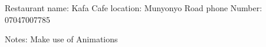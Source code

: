Restaurant name: Kafa Cafe
location: Munyonyo Road
phone Number: 07047007785

Notes:
Make use of Animations